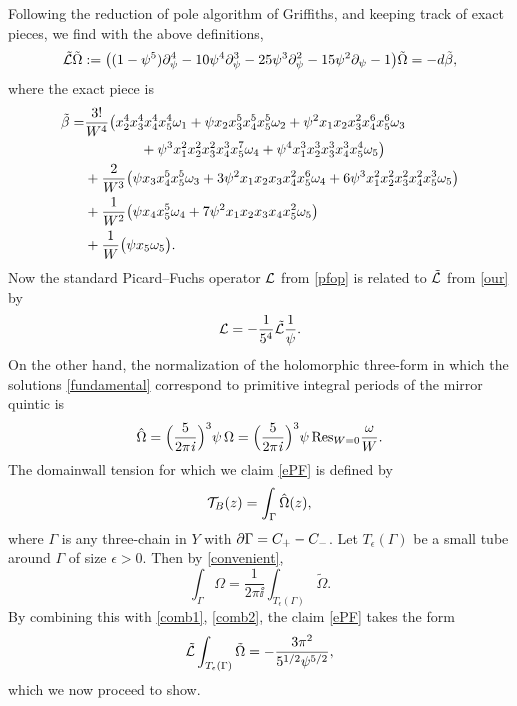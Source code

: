 Following the reduction of pole algorithm of Griffiths, and keeping track of exact
pieces, we find with the above definitions,
\begin{equation}
\eqlabel{our}
\tilde\call \tilde\Omega := \bigl((1-\psi^5)\partial_\psi^4 - 10 \psi^4 \partial_\psi^3
-25\psi^3\partial_\psi^2 - 15\psi^2 \partial_\psi -1\bigr)\tilde\Omega 
= - d\tilde\beta ,
\end{equation}
where the exact piece is 
\begin{equation}
\eqlabel{exact}
\begin{split}
\tilde\beta = & \frac{3!}{W^4}\bigl(
x_2^4x_3^4x_4^4x_5^4\omega_1+\psi x_2x_3^5x_4^5x_5^5\omega_2 +
\psi^2 x_1x_2x_3^2x_4^6x_5^6\omega_3 \\&\qquad\qquad
+\psi^3 x_1^2x_2^2x_3^2x_4^3x_5^7\omega_4 + 
\psi^4 x_1^3x_2^3x_3^3x_4^3x_5^4\omega_5\bigl)\\
&+\frac{2}{W^3}\bigl(\psi x_3x_4^5x_5^5\omega_3 + 3\psi^2 x_1x_2x_3 x_4^2x_5^6\omega_4
+ 6\psi^3 x_1^2x_2^2x_3^2x_4^2x_5^3\omega_5\bigr)\\
&+\frac{1}{W^2}\bigl(\psi x_4x_5^5\omega_4 + 7\psi^2 x_1x_2x_3x_4x_5^2\omega_5\bigr) \\
&+ \frac{1}{W}\bigl(\psi x_5\omega_5\bigr) .
\end{split}
\end{equation}
Now the standard Picard--Fuchs operator ${\cal L}$ from \eqref{pfop} is related to $\tilde{{\cal L}}$
from \eqref{our} by
\begin{equation}
\eqlabel{comb1}
\call = -\frac{1}{5^4}\tilde\call\frac{1}{\psi} .
\end{equation}
On the other hand, the normalization of the holomorphic three-form in which the solutions
\eqref{fundamental} correspond to primitive integral periods of the mirror quintic is
\cite{cdgp}
\begin{equation}
\eqlabel{comb2}
\hat\Omega = \Bigl(\frac{5}{2\pi\ii}\Bigr)^3 \psi\, \Omega
= \Bigl(\frac{5}{2\pi\ii}\Bigr)^3 \psi\, {\rm Res}_{W=0}\frac{\omega}{W} .
\end{equation}
The domainwall tension for which we claim \eqref{ePF} is defined by
\begin{equation}
{\cal T}_B(z) = \int_\Gamma\hat\Omega(z) ,
\end{equation}
where $\Gamma$ is any three-chain in $Y$ with $\partial\Gamma=C_+-C_-$. Let $T_\epsilon(\Gamma)$
be a small tube around $\Gamma$ of size $\epsilon>0$. Then by \eqref{convenient},
\begin{equation}
\int_\Gamma\Omega = \frac{1}{2\pi\ii} \int_{T_\epsilon(\Gamma)}\tilde \Omega .
\end{equation}
By combining this with \eqref{comb1}, \eqref{comb2}, the claim \eqref{ePF} takes the form
\begin{equation}
\eqlabel{now}
\tilde\call\int_{T_\epsilon(\Gamma)}\tilde\Omega = -\frac{3\pi^2}{5^{1/2} \psi^{5/2}} ,
\end{equation}
which we now proceed to show.

